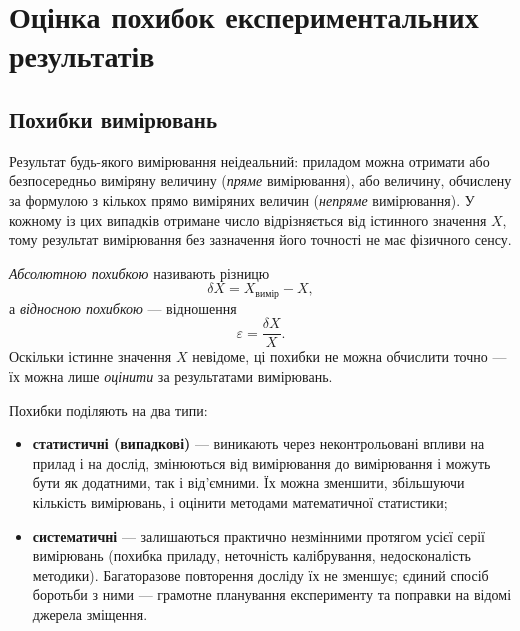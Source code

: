 
\chapter*{Оцінка похибок експериментальних результатів}
\label{ch:errors}


\section{Похибки вимірювань}
\label{sec:errors_intro}

Результат будь-якого вимірювання неідеальний: приладом можна отримати
або безпосередньо виміряну величину (\emph{пряме} вимірювання), або
величину, обчислену за формулою з кількох прямо виміряних величин
(\emph{непряме} вимірювання). У кожному із цих випадків отримане число
відрізняється від істинного значення $X$, тому результат вимірювання
без зазначення його точності не має фізичного сенсу.

\emph{Абсолютною похибкою} називають різницю
\begin{equation}\label{eq:delta}
	\delta X = X_{\text{вимір}} - X,
\end{equation}
а \emph{відносною похибкою} --- відношення
\begin{equation}\label{eq:reldelta}
	\varepsilon = \frac{\delta X}{X}.
\end{equation}
Оскільки істинне значення $X$ невідоме, ці похибки не можна обчислити
точно --- їх можна лише \emph{оцінити} за результатами вимірювань.

Похибки поділяють на два типи:
\begin{itemize}
	\item \textbf{статистичні (випадкові)} --- виникають через
	неконтрольовані впливи на прилад і на дослід, змінюються від
	вимірювання до вимірювання і можуть бути як додатними, так і
	від'ємними. Їх можна зменшити, збільшуючи кількість вимірювань, і
	оцінити методами математичної статистики;
	\item \textbf{систематичні} --- залишаються практично незмінними
	протягом усієї серії вимірювань (похибка приладу, неточність
	калібрування, недосконалість методики). Багаторазове повторення
	досліду їх не зменшує; єдиний спосіб боротьби з ними --- грамотне
	планування експерименту та поправки на відомі джерела зміщення.
\end{itemize}

